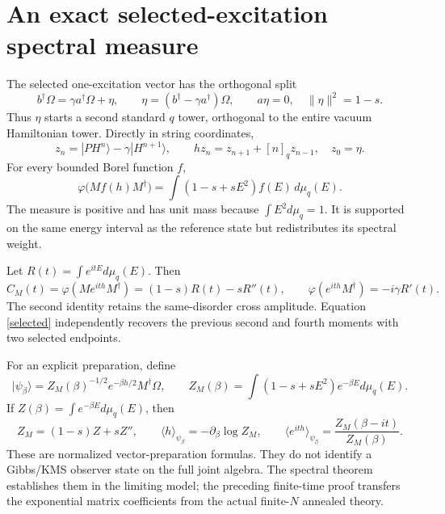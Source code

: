 \documentclass[11pt]{article}
\newcommand{\ph}{\varphi}
\newcommand{\qn}[1]{[#1]_q}
\begin{document}
\newpage
\section{An exact selected-excitation spectral measure}
The selected one-excitation vector has the orthogonal split
\begin{equation}
 b^\dagger\Omega=\gamma a^\dagger\Omega+\eta,
 \qquad \eta=(b^\dagger-\gamma a^\dagger)\Omega,
 \qquad a\eta=0,\quad\|\eta\|^2=1-s.
\end{equation}
Thus $\eta$ starts a second standard $q$ tower, orthogonal to the
entire vacuum Hamiltonian tower. Directly in string coordinates,
\begin{equation}
 z_n=|PH^n\rangle-\gamma|H^{n+1}\rangle,
 \qquad hz_n=z_{n+1}+\qn n z_{n-1},\quad z_0=\eta.
\end{equation}
For every bounded Borel function $f$,
\begin{equation}\label{selected}
 \boxed{\ph\bigl(Mf(h)M^\dagger\bigr)
       =\int (1-s+sE^2)f(E)\,d\mu_q(E).}
\end{equation}
The measure is positive and has unit mass because
$\int E^2d\mu_q=1$. It is supported on the same energy interval
as the reference state but redistributes its spectral weight.

Let $R(t)=\int e^{itE}d\mu_q(E)$. Then
\begin{equation}\label{return}
 C_M(t)=\ph(Me^{ith}M^\dagger)=(1-s)R(t)-sR''(t),
 \qquad \ph(e^{ith}M^\dagger)=-i\gamma R'(t).
\end{equation}
The second identity retains the same-disorder cross amplitude.
Equation \eqref{selected} independently recovers the previous
second and fourth moments with two selected endpoints.

For an explicit preparation, define
\begin{equation}
 |\psi_\beta\rangle=Z_M(\beta)^{-1/2}
       e^{-\beta h/2}M^\dagger\Omega,\qquad
 Z_M(\beta)=\int(1-s+sE^2)e^{-\beta E}d\mu_q(E).
\end{equation}
If $Z(\beta)=\int e^{-\beta E}d\mu_q(E)$, then
\begin{equation}
 Z_M=(1-s)Z+sZ'',\qquad
 \langle h\rangle_{\psi_\beta}=-\partial_\beta\log Z_M,
 \qquad
 \langle e^{ith}\rangle_{\psi_\beta}
       =\frac{Z_M(\beta-it)}{Z_M(\beta)}.
\end{equation}
These are normalized vector-preparation formulas. They do not
identify a Gibbs/KMS observer state on the full joint algebra.
The spectral theorem establishes them in the limiting model;
the preceding finite-time proof transfers the exponential
matrix coefficients from the actual finite-$N$ annealed theory.
\end{document}
